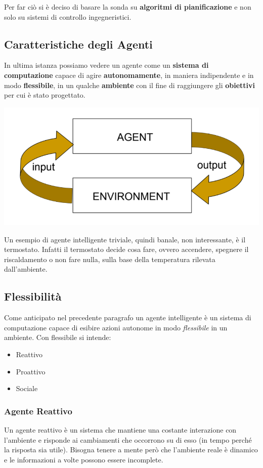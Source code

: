 Per far ciò si è deciso di basare la sonda su \textbf{algoritmi di pianificazione} e non solo su sistemi di controllo ingegneristici.

\subsection{Caratteristiche degli Agenti}
In ultima istanza possiamo vedere un agente come un \textbf{sistema di computazione} capace di agire \textbf{autonomamente}, in maniera indipendente e in modo \textbf{flessibile}, in un qualche \textbf{ambiente} con il fine di raggiungere gli \textbf{obiettivi} per cui è stato progettato.

\begin{center}
    \includegraphics[scale=0.4]{images/agente_ambiente.PNG}
\end{center}

Un esempio di agente intelligente triviale, quindi banale, non interessante, è il termostato. Infatti il termostato decide cosa fare, ovvero accendere, spegnere il riscaldamento o non fare nulla, sulla base della temperatura rilevata dall'ambiente.

\subsection{Flessibilità}
Come anticipato nel precedente paragrafo un agente intelligente è un sistema di computazione capace di esibire azioni autonome in modo \textit{flessibile} in un ambiente. Con flessibile si intende:
\begin{itemize}
    \item Reattivo
    \item Proattivo
    \item Sociale
\end{itemize}

\subsubsection{Agente Reattivo}
Un agente reattivo è un sistema che mantiene una costante interazione con l’ambiente e risponde ai cambiamenti che occorrono su di esso (in tempo perché la risposta sia utile).
Bisogna tenere a mente però che l'ambiente reale è dinamico e le informazioni a volte possono essere incomplete.

